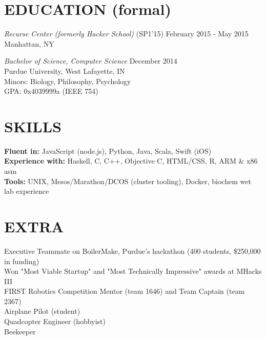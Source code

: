 \documentclass[margin,4pt]{res} %
\begin{document}
\begin{resume}
\section{EDUCATION (formal)}
	{\sl Recurse Center (formerly Hacker School)} \hfill (SP1'15) February 2015 - May 2015\\
		Manhattan, NY

	{\sl Bachelor of Science, Computer Science }\hfill  December 2014\\
		Purdue University, West Lafayette, IN\\
		Minors: Biology, Philosophy, Psychology \\
		GPA: 0x4039999a (IEEE 754)


\section{SKILLS} 
	{\bf Fluent in:} JavaScript (node.js), Python, Java, Scala, Swift (iOS)\\
 	{\bf Experience with:} Haskell, C, C++, Objective C, HTML/CSS, R, ARM \& x86 asm\\
	{\bf Tools:} UNIX, Mesos/Marathon/DCOS (cluster tooling), Docker, biochem wet lab experience


\section{EXTRA}  
	Executive Teammate on BoilerMake, Purdue's hackathon (400 students, \$250,000 in funding)\\
	Won "Most Viable Startup" and "Most Technically Impressive" awards at MHacks III\\
	FIRST Robotics Competition Mentor (team 1646) and Team Captain (team 2367)\\
	Airplane Pilot (student)\\
	Quadcopter Engineer (hobbyist)\\
	Beekeeper\\


\end{resume}
\end{document}

